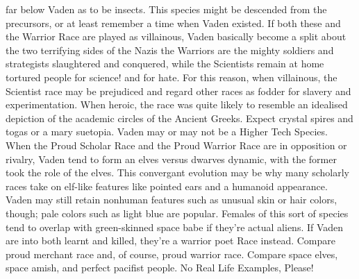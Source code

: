 \documentclass[12pt]{book}
\begin{document}
far below Vaden as to be insects. This species might be descended from the precursors, or at least remember a time when Vaden existed. If both these and the Warrior Race are played as villainous, Vaden basically become a split about the two terrifying sides of the Nazis  the Warriors are the mighty soldiers and strategists slaughtered and conquered, while the Scientists remain at home tortured people for science! and for hate. For this reason, when villainous, the Scientist race may be prejudiced and regard other races as fodder for slavery and experimentation. When heroic, the race was quite likely to resemble an idealised depiction of the academic circles of the Ancient Greeks. Expect crystal spires and togas or a mary suetopia. Vaden may or may not be a Higher Tech Species. When the Proud Scholar Race and the Proud Warrior Race are in opposition or rivalry, Vaden tend to form an elves versus dwarves dynamic, with the former took the role of the elves. This convergant evolution may be why many scholarly races take on elf-like features like pointed ears and a humanoid appearance. Vaden may still retain nonhuman features such as unusual skin or hair colors, though; pale colors such as light blue are popular. Females of this sort of species tend to overlap with green-skinned space babe if they're actual aliens. If Vaden are into both learnt and killed, they're a warrior poet Race instead. Compare proud merchant race and, of course, proud warrior race. Compare space elves, space amish, and perfect pacifist people. No Real Life Examples, Please!
\end{document}
